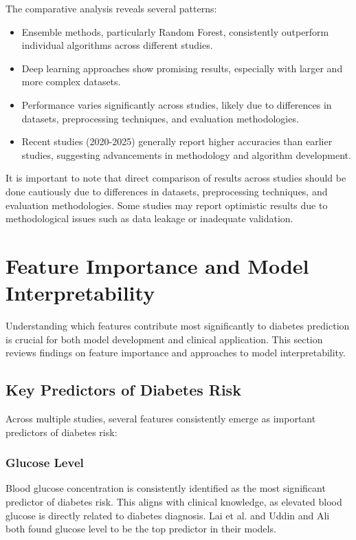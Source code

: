 \documentclass[journal]{IEEEtran}
\begin{document}
The comparative analysis reveals several patterns:
\begin{itemize}
    \item Ensemble methods, particularly Random Forest, consistently outperform individual algorithms across different studies.
    \item Deep learning approaches show promising results, especially with larger and more complex datasets.
    \item Performance varies significantly across studies, likely due to differences in datasets, preprocessing techniques, and evaluation methodologies.
    \item Recent studies (2020-2025) generally report higher accuracies than earlier studies, suggesting advancements in methodology and algorithm development.
\end{itemize}

It is important to note that direct comparison of results across studies should be done cautiously due to differences in datasets, preprocessing techniques, and evaluation methodologies. Some studies may report optimistic results due to methodological issues such as data leakage or inadequate validation.

\section{Feature Importance and Model Interpretability}
Understanding which features contribute most significantly to diabetes prediction is crucial for both model development and clinical application. This section reviews findings on feature importance and approaches to model interpretability.

\subsection{Key Predictors of Diabetes Risk}
Across multiple studies, several features consistently emerge as important predictors of diabetes risk:

\subsubsection{Glucose Level}
Blood glucose concentration is consistently identified as the most significant predictor of diabetes risk. This aligns with clinical knowledge, as elevated blood glucose is directly related to diabetes diagnosis. Lai et al. \cite{lai2019} and Uddin and Ali \cite{uddin2023} both found glucose level to be the top predictor in their models.
\end{document}
